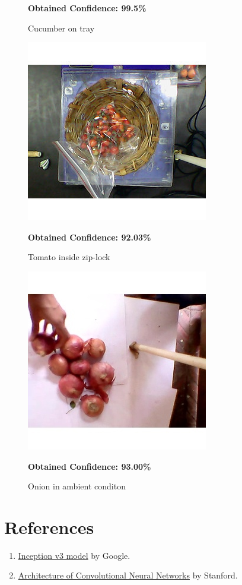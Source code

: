 \documentclass[a4paper,12pt,oneside]{book}
\begin{document}
\begin{itemize}
\begin{figure}[!ht]
	  	\caption{Cucumber on tray}\textbf{ Obtained Confidence: 99.5\%}
	  	\label{fig:cucumber-tray}
	  \end{figure}
  \hfill
	  \begin{figure}[!ht]
	  	\centering
	  	\includegraphics[width=0.5\linewidth]{"tomato - ziplock"}
	  	\caption{Tomato inside zip-lock}\textbf{ Obtained Confidence: 92.03\%}
	  	\label{fig:tomato---ziplock}
	  \end{figure}
	  \begin{figure}[!ht]
	  	\centering
	  	\includegraphics[width=0.5\linewidth]{"onion - hand"}
	  	\caption{Onion in ambient conditon}\textbf{ Obtained Confidence: 93.00\%}
	  	\label{fig:onion---hand}
	  \end{figure}
	  
\end{itemize}

\newpage
\section{References}
\begin{enumerate}
	\item \href{https://arxiv.org/abs/1512.00567}{Inception v3 model} by Google.
	\item \href{http://cs231n.github.io/convolutional-networks/}{Architecture of Convolutional Neural Networks} by Stanford.
\end{enumerate}
\end{document}
